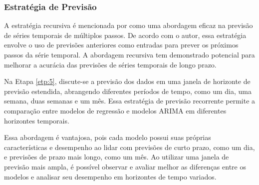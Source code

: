 \subsubsection{Estrat\'egia de Previs\~ao}\label{subsubsec:est}

A estratégia recursiva é mencionada por  como uma abordagem eficaz na previsão de séries temporais de múltiplos passos. De acordo com o autor, essa estratégia envolve o uso de previsões anteriores como entradas para prever os próximos passos da série temporal. A abordagem recursiva tem demonstrado potencial para melhorar a acurácia das previsões de séries temporais de longo prazo.

Na Etapa \ref{etp:5}, discute-se a previsão dos dados em uma janela de horizonte de previsão estendida, abrangendo diferentes períodos de tempo, como um dia, uma semana, duas semanas e um mês. Essa estratégia de previsão recorrente permite a comparação entre modelos de regressão e modelos ARIMA em diferentes horizontes temporais.

Essa abordagem é vantajosa, pois cada modelo possui suas próprias características e desempenho ao lidar com previsões de curto prazo, como um dia, e previsões de prazo mais longo, como um mês. Ao utilizar uma janela de previsão mais ampla, é possível observar e avaliar melhor as diferenças entre os modelos e analisar seu desempenho em horizontes de tempo variados.